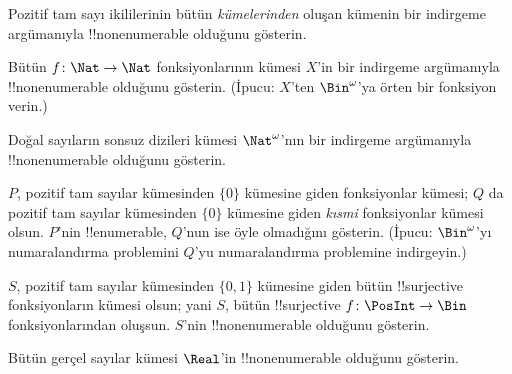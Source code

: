 \documentclass[../../../include/open-logic-section]{subfiles}
\begin{document}
\begin{prob}
Pozitif tam sayı ikililerinin bütün \emph{kümelerinden} oluşan kümenin bir
indirgeme argümanıyla !!{nonenumerable} olduğunu gösterin.
\end{prob}

\begin{prob}\label{sfr:siz:red:prob:nat-nat}
  Bütün $f\colon\Nat\to\Nat$ fonksiyonlarının kümesi $X$'in bir indirgeme
  argümanıyla !!{nonenumerable} olduğunu gösterin. (İpucu: $X$'ten
  $\Bin^\omega$'ya örten bir fonksiyon verin.)
\end{prob}

\begin{prob}
Doğal sayıların sonsuz dizileri kümesi $\Nat^\omega$'nın bir indirgeme
argümanıyla !!{nonenumerable} olduğunu gösterin.
\end{prob}

\begin{prob}
$P$, pozitif tam sayılar kümesinden $\{0\}$ kümesine giden fonksiyonlar
kümesi; $Q$ da pozitif tam sayılar kümesinden $\{0\}$ kümesine giden
\emph{kısmi} fonksiyonlar kümesi olsun. $P$'nin !!{enumerable}, $Q$'nun ise
öyle olmadığını gösterin. (İpucu: $\Bin^\omega$'yı numaralandırma problemini
$Q$'yu numaralandırma problemine indirgeyin.)
\end{prob}

\begin{prob}
$S$, pozitif tam sayılar kümesinden $\{0,1\}$ kümesine giden bütün
!!{surjective} fonksiyonların kümesi olsun; yani $S$, bütün !!{surjective}
$f\colon\PosInt\to\Bin$ fonksiyonlarından oluşsun. $S$'nin
!!{nonenumerable} olduğunu gösterin.
\end{prob}

\begin{prob}
Bütün gerçel sayılar kümesi $\Real$'in !!{nonenumerable} olduğunu gösterin.
\end{prob}
\end{document}
